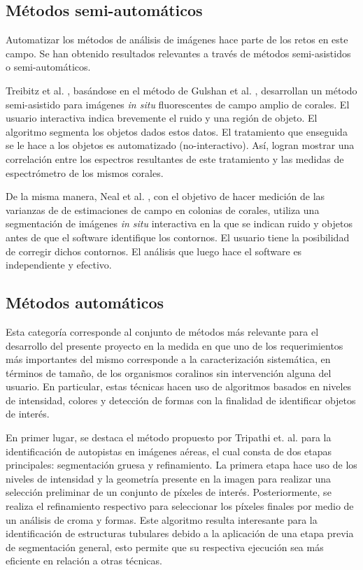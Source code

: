 \documentclass[journal]{IEEEtran}
\begin{document}
\subsection{Métodos semi-automáticos}
Automatizar los métodos de análisis de imágenes hace parte de los retos en este campo.
Se han obtenido resultados relevantes a través de métodos semi-asistidos o
semi-automáticos. 

Treibitz et al. \cite{treibitz_wide_2015}, basándose en el método de
Gulshan et al. \cite{gulshan_geodesic_2010}, desarrollan un método semi-asistido para
imágenes \textit{in situ} fluorescentes de campo amplio de corales. El usuario interactiva indica
brevemente el ruido y una región de objeto. El algoritmo segmenta los objetos dados estos
datos. El tratamiento que enseguida se le hace a los objetos es automatizado
(no-interactivo). Así, logran mostrar una correlación entre los espectros resultantes
de este tratamiento y las medidas de espectrómetro de los mismos corales. 

De la misma manera, Neal et al. \cite{neal_methods_2015}, con el objetivo de hacer medición de las varianzas de de estimaciones de campo en colonias de corales, utiliza una
segmentación de imágenes \textit{in situ} interactiva en la que se indican ruido y objetos antes de que el software identifique los contornos. El usuario tiene la posibilidad de corregir dichos contornos. El análisis que luego hace el software es independiente y efectivo.

\subsection{Métodos automáticos}
Esta categoría corresponde al conjunto de métodos más relevante para el desarrollo del
presente proyecto en la medida en que uno de los requerimientos más importantes del mismo
corresponde a la caracterización sistemática, en términos de tamaño, de los organismos
coralinos sin intervención alguna del usuario. En particular, estas técnicas hacen uso de
algoritmos basados en niveles de intensidad, colores y detección de formas con la
finalidad de identificar objetos de interés.

En primer lugar, se destaca el método propuesto por Tripathi et. al. \cite{autopistas}
para la identificación de autopistas en imágenes aéreas, el cual consta de dos etapas
principales: segmentación gruesa y refinamiento. La primera etapa hace uso de los niveles
de intensidad y la geometría presente en la imagen para realizar una selección preliminar
de un conjunto de píxeles de interés. Posteriormente, se realiza el refinamiento
respectivo para seleccionar los píxeles finales por medio de un análisis de croma y
formas. Este algoritmo resulta interesante para la identificación de estructuras
tubulares debido a la aplicación de una etapa previa de segmentación general, esto
permite que su respectiva ejecución sea más eficiente en relación a otras técnicas.
\end{document}
